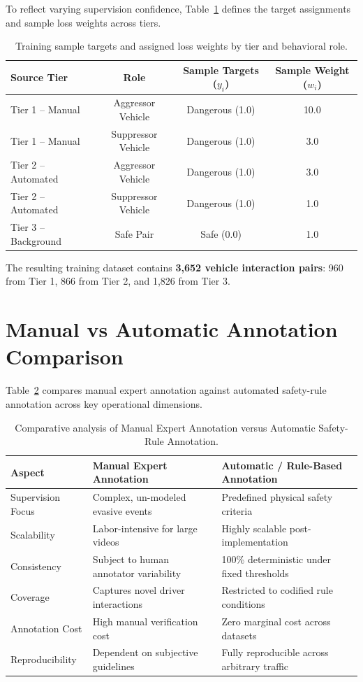 To reflect varying supervision confidence, Table~\ref{tab:weights} defines the target assignments and sample loss weights across tiers.

\begin{table}[H]
\centering
\caption{Training sample targets and assigned loss weights by tier and behavioral role.}
\label{tab:weights}
\begin{tabular}{lccc}
\toprule
\textbf{Source Tier} & \textbf{Role} & \textbf{Sample Targets ($y_i$)} & \textbf{Sample Weight ($w_i$)} \\
\midrule
Tier 1 -- Manual    & Aggressor Vehicle  & Dangerous (1.0) & 10.0 \\
Tier 1 -- Manual    & Suppressor Vehicle & Dangerous (1.0) & 3.0 \\
Tier 2 -- Automated & Aggressor Vehicle  & Dangerous (1.0) & 3.0 \\
Tier 2 -- Automated & Suppressor Vehicle & Dangerous (1.0) & 1.0 \\
Tier 3 -- Background& Safe Pair          & Safe (0.0)      & 1.0 \\
\bottomrule
\end{tabular}
\end{table}

The resulting training dataset contains \textbf{3,652 vehicle interaction pairs}: 960 from Tier 1, 866 from Tier 2, and 1,826 from Tier 3.

\section{Manual vs Automatic Annotation Comparison}

Table~\ref{tab:manual_vs_auto} compares manual expert annotation against automated safety-rule annotation across key operational dimensions.

\begin{table}[H]
\centering
\small
\caption{Comparative analysis of Manual Expert Annotation versus Automatic Safety-Rule Annotation.}
\label{tab:manual_vs_auto}
\begin{tabularx}{\textwidth}{l X X}
\toprule
\textbf{Aspect} & \textbf{Manual Expert Annotation} & \textbf{Automatic / Rule-Based Annotation} \\
\midrule
Supervision Focus & Complex, un-modeled evasive events & Predefined physical safety criteria \\
Scalability       & Labor-intensive for large videos & Highly scalable post-implementation \\
Consistency       & Subject to human annotator variability & 100\% deterministic under fixed thresholds \\
Coverage          & Captures novel driver interactions & Restricted to codified rule conditions \\
Annotation Cost   & High manual verification cost & Zero marginal cost across datasets \\
Reproducibility   & Dependent on subjective guidelines & Fully reproducible across arbitrary traffic \\
\bottomrule
\end{tabularx}
\end{table}

